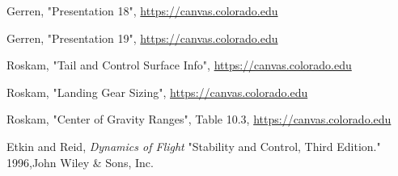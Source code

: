 \documentclass[conf]{new-aiaa}
\begin{document}
\begin{thebibliography}{99}


 Gerren, "Presentation 18", \url{https://canvas.colorado.edu}

 Gerren, "Presentation 19", \url{https://canvas.colorado.edu}

 Roskam, "Tail and Control Surface Info", \url{https://canvas.colorado.edu}

 Roskam, "Landing Gear Sizing", \url{https://canvas.colorado.edu}

 Roskam, "Center of Gravity Ranges", Table 10.3, \url{https://canvas.colorado.edu}

 Etkin and Reid, \textit{Dynamics of Flight} "Stability and Control, Third Edition." 1996,John Wiley \& Sons, Inc.







\end{thebibliography}
\end{document}
